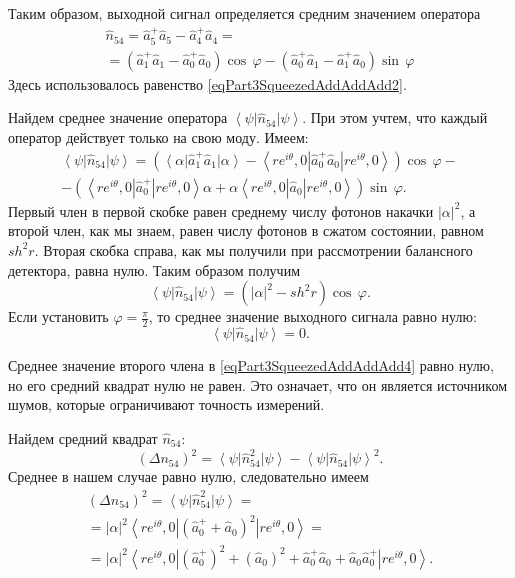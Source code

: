 Таким образом, выходной сигнал определяется средним значением оператора
\begin{eqnarray}
\hat{n}_{54} = \hat{a}_5^{+}\hat{a}_5 - 
\hat{a}_4^{+}\hat{a}_4 = 
\nonumber \\
=
\left(
\hat{a}_1^{+}\hat{a}_1 - 
\hat{a}_0^{+}\hat{a}_0
\right) \cos\,\varphi
- 
\left(
\hat{a}_0^{+}\hat{a}_1 - 
\hat{a}_1^{+}\hat{a}_0
\right) \sin\,\varphi
\end{eqnarray}
Здесь использовалось равенство \eqref{eqPart3SqueezedAddAddAdd2}.

Найдем среднее значение оператора
$\left<\psi\right|\hat{n}_{54}\left|\psi\right>$. При этом учтем, что
каждый оператор действует только на свою моду. Имеем:
\begin{eqnarray}
\left<\psi\right|\hat{n}_{54}\left|\psi\right> = 
\left(
\left<\alpha\right|\hat{a}_1^{+}\hat{a}_1\left|\alpha\right>
- 
\left<r e^{i\theta}, 0\right|\hat{a}_0^{+}\hat{a}_0\left|r
e^{i\theta}, 0\right> 
\right) \cos\,\varphi -
\nonumber \\
-
\left(
\left<r e^{i\theta}, 0\right|\hat{a}_0^{+}\left|r
e^{i\theta}, 0\right>\alpha +
\alpha 
\left<r e^{i\theta}, 0\right|\hat{a}_0\left|r
e^{i\theta}, 0\right>
\right) \sin\,\varphi.
\label{eqPart3SqueezedAddAddAdd4}
\end{eqnarray}
Первый член в первой скобке равен среднему числу фотонов накачки
$\left|\alpha\right|^2$, а второй член, как мы знаем, равен числу
фотонов в сжатом состоянии, равном $sh^2 r$. Вторая скобка справа, как
мы получили при рассмотрении балансного детектора, равна нулю. Таким
образом получим
\begin{equation}
\left<\psi\right|\hat{n}_{54}\left|\psi\right> = 
\left(
\left|\alpha\right|^2 - sh^2 r
\right)
\cos\,\varphi.
\nonumber
\end{equation}
Если установить $\varphi=\frac{\pi}{2}$, то среднее значение выходного
сигнала равно нулю:
\[
\left<\psi\right|\hat{n}_{54}\left|\psi\right> = 0.
\]

Среднее значение второго члена в \eqref{eqPart3SqueezedAddAddAdd4}
равно нулю, но его средний квадрат нулю не равен. Это означает, что он
является источником шумов, которые ограничивают точность измерений.

Найдем средний квадрат $\hat{n}_{54}$:
\begin{equation}
\left(\Delta n_{54}\right)^2 = 
\left<\psi\right|\hat{n}_{54}^2\left|\psi\right> -
\left<\psi\right|\hat{n}_{54}\left|\psi\right>^2.
\nonumber
\end{equation}
Среднее в нашем случае равно нулю, следовательно имеем
\begin{eqnarray}
\left(\Delta n_{54}\right)^2 = 
\left<\psi\right|\hat{n}_{54}^2\left|\psi\right> =
\nonumber \\
=
\left|\alpha\right|^2
\left<r e^{i\theta}, 0\right|
\left(\hat{a}_0^{+} + \hat{a}_0\right)^2
\left|r e^{i\theta}, 0\right> =
\nonumber \\
=
\left|\alpha\right|^2
\left<r e^{i\theta}, 0\right|
\left(\hat{a}_0^{+}\right)^2 + 
\left(\hat{a}_0\right)^2 + 
\hat{a}_0^{+}\hat{a}_0 +
\hat{a}_0\hat{a}_0^{+}
\left|r e^{i\theta}, 0\right>.
\nonumber
\end{eqnarray}

